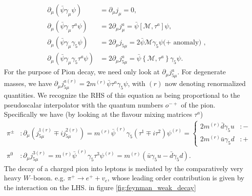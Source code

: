 \documentclass[a4paper,10pt]{book}
\begin{document}
\begin{equation}\label{eq:Ward_identities}
\begin{aligned}
\partial_{\mu}\left(\bar{\psi} \gamma_{\mu} \psi\right) &=\partial_{\mu}j_\mu=0, \\
\partial_{\mu}\left(\bar{\psi} \gamma_{\mu} \tau^{a} \psi\right) &=2\partial_{\mu}j_\mu^a=\bar{\psi}\left[\mathcal{M}, \tau^{a}\right] \psi, \\
\partial_{\mu}\left(\bar{\psi} \gamma_{\mu} \gamma_{5} \psi\right) &=2\partial_{\mu}j_{5\mu}=2 \bar{\psi} \mathcal{M} \gamma_{5} \psi(+\text { anomaly) },\\
\partial_{\mu}\left(\bar{\psi} \gamma_{\mu} \gamma_{5} \tau^{a} \psi\right) &=2\partial_{\mu}j_{5\mu}^a=\bar{\psi}\left\{\mathcal{M}, \tau^{a}\right\} \gamma_{5} \psi.
\end{aligned}
\end{equation}
For the purpose of Pion decay, we need only look at $\partial_{\mu}j_{5\mu}^a$. For degenerate masses, we have $\partial_{\mu}j_{5\mu}^{a(r)} = 2m^{(r)}\bar{\psi}\tau^{a}\gamma_{5} \psi$, with $(r)$ now denoting renormalized quantities. We recognize the RHS of this equation as being proportional to the pseudoscalar interpolator with the quantum numbers $o^{-+}$ of the pion. Specifically we have (by looking at the flavour mixing matrices $\tau^a$)
\begin{equation}
\begin{aligned}
\pi^{\pm}&: \partial_\mu \left( j_{5\mu}^{1(r)} \mp ij_{5\mu}^{2(r)}\right) = m^{(r)}\bar{\psi}^{(r)} \gamma_5\left(\tau^1 \mp i\tau^2 \right)\psi^{(r)} = \begin{cases} 
      2m^{(r)}\bar{d}\gamma_5u & :- \\
      2m^{(r)}\bar{u}\gamma_5d & :+
   \end{cases}\\ \pi^{0}&: \partial_\mu j_{5\mu}^{3(r)} = m^{(r)}\bar{\psi}^{(r)} \gamma_5\tau^3\psi^{(r)} =m^{(r)}\left( \bar{u}\gamma_5u-\bar{d}\gamma_5d \right).
\end{aligned}
\end{equation}
The decay of a charged pion into leptons is mediated by the comparatively very heavy $W$--boson. e.g. $\pi^{+} \rightarrow e^{+}+v_{e}$, whose leading order contribution is given by the interaction on the LHS. in figure \ref{fig:feynman_weak_decay}
\end{document}
